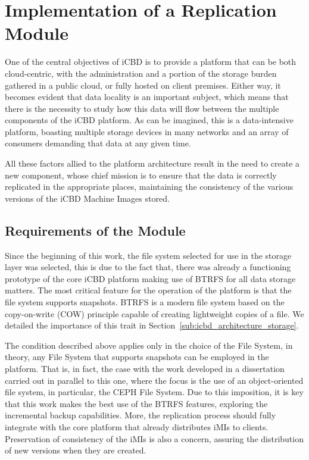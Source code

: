 \section{Implementation of a Replication Module}
\label{sec:impl_replication}

One of the central objectives of iCBD is to provide a platform that can be both cloud-centric, with the administration and a portion of the storage burden gathered in a public cloud, or fully hosted on client premises. Either way, it becomes evident that data locality is an important subject, which means that there is the necessity to study how this data will flow between the multiple components of the iCBD platform.
As can be imagined, this is a data-intensive platform, boasting multiple storage devices in many networks and an array of consumers demanding that data at any given time.

All these factors allied to the platform architecture result in the need to create a new component, whose chief mission is to ensure that the data is correctly replicated in the appropriate places, maintaining the consistency of the various versions of the iCBD Machine Images stored.



\subsection{Requirements of the Module}
\label{sub:requirements_icbdrep}

Since the beginning of this work, the file system selected for use in the storage layer was selected, this is due to the fact that, there was already a functioning prototype of the core iCBD platform making use of BTRFS for all data storage matters. The most critical feature for the operation of the platform is that the file system supports snapshots. BTRFS is a modern file system based on the copy-on-write (COW) principle capable of creating lightweight copies of a file. We detailed the importance of this trait in Section~\ref{sub:icbd_architecture_storage}.
 
The condition described above applies only in the choice of the File System, in theory, any File System that supports snapshots can be employed in the platform. That is, in fact, the case with the work developed in a dissertation carried out in parallel to this one, where the focus is the use of an object-oriented file system, in particular, the CEPH File System.
Due to this imposition, it is key that this work makes the best use of the BTRFS features, exploring the incremental backup capabilities. More, the replication process should fully integrate with the core platform that already distributes iMIs to clients. Preservation of consistency of the iMIs is also a concern, assuring the distribution of new versions when they are created.

